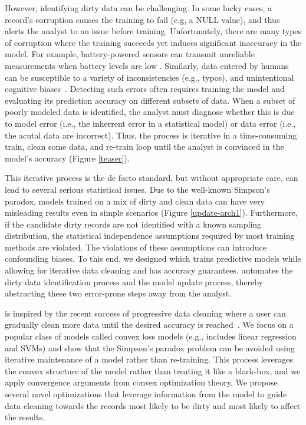 However, identifying dirty data can be challenging.
In some lucky cases, a record's corruption causes the training to fail (e.g, a NULL value), and thus alerts the analyst to an issue before training.
Unfortunately, there are many types of corruption where the training succeeds yet induces significant inaccuracy in the model.
For example, battery-powered sensors can transmit unreliable measurements when battery levels are low \cite{DBLP:conf/pervasive/JefferyAFHW06}. 
Similarly, data entered by humans can be susceptible to a variety of inconsistencies (e.g., typos), and unintentional cognitive biases~\cite{DBLP:conf/recsys/KrishnanPFG14}.
Detecting such errors often requires training the model and evaluating its prediction accuracy on different subsets of data. 
When a subset of poorly modeled data is identified, the analyst must diagnose whether this is due to model error (i.e., the inherrent error in a statistical model) or data error (i.e., the acutal data are incorrect).
Thus, the process is iterative in a time-consuming train, clean some data, and re-train loop until the analyst is convinced in the model's accuracy (Figure \ref{teaser}).

This iterative process is the de facto standard, but without appropriate care, can lead to several serious statistical issues.
Due to the well-known Simpson's paradox, models trained on a mix of dirty and clean data can have very misleading results even in simple scenarios (Figure \ref{update-arch1}).
Furthermore, if the candidate dirty records are not identified with a known sampling distribution, the statistical independence assumptions required by most training methods are violated. 
The violations of these assumptions can introduce confounding biases.
To this end, we designed \sys which trains predictive models while allowing for iterative data cleaning and has accuracy guarantees.
\sys automates the dirty data identification process and the model update process, thereby abstracting these two error-prone steps away from the analyst.

\sys is inspired by the recent success of progressive data cleaning where a user can gradually clean more data until the desired accuracy is reached~\cite{altowim2014progressive, whang2014incremental, papenbrock2015progressive, gruenheid2014incremental, mayfield2010eracer, DBLP:journals/pvldb/YakoutENOI11, yakout2013don}.
We focus on a popular class of models called convex loss models (e.g., includes linear regression and SVMs) and show that the Simpson's paradox problem can be avoided using iterative maintenance of a model rather than re-training.
This process leverages the convex structure of the model rather than treating it like a black-box, and we apply convergence arguments from convex optimization theory.
We propose several novel optimizations that leverage information from the model to guide data cleaning towards the records most likely to be dirty and most likely to affect the results.

